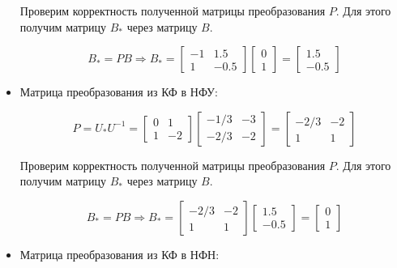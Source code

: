 \documentclass[14pt,a4paper,report]{report}
\begin{document}
\begin{itemize}
	Проверим корректность полученной матрицы преобразования $P$. Для этого получим матрицу $B_{*}$ через матрицу $B$.
	
	\begin{equation*}
	\text{$B_{*}=PB$}
	\Longrightarrow
	\text{$B_{*}=\begin{bmatrix} -1 & 1.5 \\ 1 & -0.5 \end{bmatrix}\begin{bmatrix} 0 \\ 1 \end{bmatrix}=\begin{bmatrix} 1.5 \\ -0.5 \end{bmatrix}$}
	\end{equation*}
	
	
	
	
	\item Матрица преобразования из КФ в НФУ:
	
	\begin{equation*}
	\text{$P=U_{*}U^{-1}=\begin{bmatrix} 0 & 1 \\ 1 & -2 \end{bmatrix}\begin{bmatrix} -1/3 & -3 \\ -2/3 & -2 \end{bmatrix}=\begin{bmatrix} -2/3 & -2 \\ 1 & 1 \end{bmatrix}$}
	\end{equation*}
	
	Проверим корректность полученной матрицы преобразования $P$. Для этого получим матрицу $B_{*}$ через матрицу $B$.
	
	\begin{equation*}
	\text{$B_{*}=PB$}
	\Longrightarrow
	\text{$B_{*}=\begin{bmatrix} -2/3 & -2 \\ 1 & 1 \end{bmatrix}\begin{bmatrix} 1.5 \\ -0.5 \end{bmatrix}=\begin{bmatrix} 0 \\ 1 \end{bmatrix}$}
	\end{equation*}
	
	\item Матрица преобразования из КФ в НФН:
	

\end{itemize}
\end{document}

